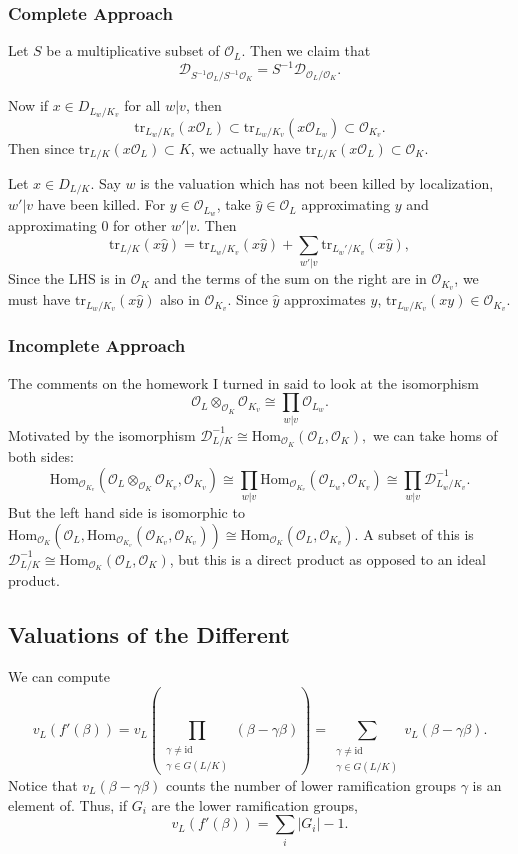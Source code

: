 \documentclass[12pt]{amsart}
\theoremstyle{named}
\newcommand{\tr}{\mathrm{tr}}
\begin{document}
\subsubsection{Complete Approach} Let $S$ be a multiplicative subset of $\mathcal{O}_L$.
Then we claim that
\[ \mathcal{D}_{S^{-1} \mathcal{O}_L/S^{-1} \mathcal{O}_K} = S^{-1} \mathcal{D}_{\mathcal{O}_L/\mathcal{O}_K}. \]

Now if $x \in D_{L_w/K_v}$ for all $w | v$, then 
\[\tr_{L_w/K_v}(x \mathcal{O}_L) \subset \tr_{L_w/K_v}(x\mathcal{O}_{L_w}) \subset \mathcal{O}_{K_v}.\]
Then since $\tr_{L/K} (x \mathcal{O}_L) \subset K$, we actually have
$\tr_{L/K}(x \mathcal{O}_L) \subset \mathcal{O}_K.$

Let $x \in D_{L/K}$. Say $w$ is the valuation which has not been killed by localization, $w' | v$
have been killed. For $y \in \mathcal{O}_{L_w}$, take $\hat{y} \in \mathcal{O}_L$ approximating $y$
and approximating $0$ for other $w' | v$. Then
\[ \mathrm{tr}_{L/K}(x \hat{y}) = \tr_{L_w/K_v}(x \hat{y}) + \sum_{w' | v} \tr_{L_w'/K_v}(x \hat{y}),\]
Since the LHS is in $\mathcal{O}_K$ and the terms of the sum on the right are in $\mathcal{O}_{K_v}$,
we must have $\tr_{L_w/K_v}(x \hat{y})$ also in $\mathcal{O}_{K_v}$. Since $\hat{y}$ approximates
$y$, $\tr_{L_w/K_v}(xy) \in \mathcal{O}_{K_v}$.

\subsubsection{Incomplete Approach} The comments on the homework I turned in said to look at the isomorphism
\[ \mathcal{O}_L \otimes_{\mathcal{O}_K} \mathcal{O}_{K_v} \cong \prod_{w|v} \mathcal{O}_{L_w}. \]
Motivated by the isomorphism $\mathcal{D}_{L/K}^{-1} \cong \mathrm{Hom}_{\mathcal{O}_K}(\mathcal{O}_L, \mathcal{O}_K),$
we can take homs of both sides:
\[ \mathrm{Hom}_{\mathcal{O}_{K_v}}(\mathcal{O}_L \otimes_{\mathcal{O}_K} \mathcal{O}_{K_v}, \mathcal{O}_{K_v})
\cong \prod_{w|v} \mathrm{Hom}_{\mathcal{O}_{K_v}}(\mathcal{O}_{L_w}, \mathcal{O}_{K_v})
\cong \prod_{w|v} \mathcal{D}_{L_w/K_v}^{-1}.\]
But the left hand side is isomorphic to $\mathrm{Hom}_{\mathcal{O}_K}(\mathcal{O}_L, \mathrm{Hom}_{\mathcal{O}_{K_v}}(\mathcal{O}_{K_v}, \mathcal{O}_{K_v}))
\cong \mathrm{Hom}_{\mathcal{O}_K}(\mathcal{O}_L, \mathcal{O}_{K_v})$. A subset of this is
$\mathcal{D}_{L/K}^{-1} \cong \mathrm{Hom}_{\mathcal{O}_K}(\mathcal{O}_L, \mathcal{O}_K)$, but this
is a direct product as opposed to an ideal product.

\subsection{Valuations of the Different} \label{vals}
We can compute
\[v_L(f'(\beta)) = v_L\left(\prod_{\substack{\gamma \neq \mathrm{id} \\
\gamma \in G(L/K)}} (\beta - \gamma \beta)\right) = \sum_{\substack{\gamma \neq \mathrm{id} \\
\gamma \in G(L/K)}} v_L(\beta - \gamma \beta).
\]
Notice that $v_L(\beta - \gamma \beta)$ counts the number of lower ramification groups $\gamma$
is an element of. Thus, if $G_i$ are the lower ramification groups,
\[ v_L(f'(\beta)) = \sum_i |G_i| - 1. \]
\end{document}
